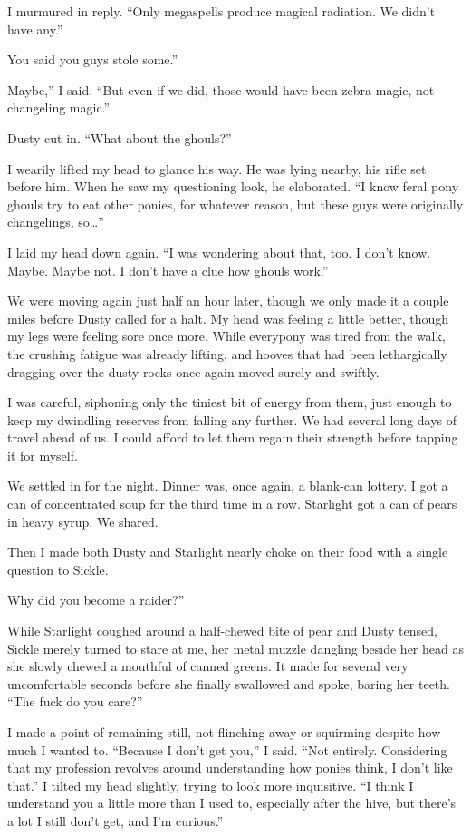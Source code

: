 I murmured in reply. “Only megaspells produce magical radiation. We didn’t have any.”

\leavevmode{}You said you guys stole some.”

\leavevmode{}Maybe,” I said. “But even if we did, those would have been zebra magic, not changeling magic.”

Dusty cut in. “What about the ghouls?”

I wearily lifted my head to glance his way. He was lying nearby, his rifle set before him. When he saw my questioning look, he elaborated. “I know feral pony ghouls try to eat other ponies, for whatever reason, but these guys were originally changelings, so…”

I laid my head down again. “I was wondering about that, too. I don’t know. Maybe. Maybe not. I don’t have a clue how ghouls work.”

We were moving again just half an hour later, though we only made it a couple miles before Dusty called for a halt. My head was feeling a little better, though my legs were feeling sore once more. While everypony was tired from the walk, the crushing fatigue was already lifting, and hooves that had been lethargically dragging over the dusty rocks once again moved surely and swiftly.

I was careful, siphoning only the tiniest bit of energy from them, just enough to keep my dwindling reserves from falling any further. We had several long days of travel ahead of us. I could afford to let them regain their strength before tapping it for myself.

We settled in for the night. Dinner was, once again, a blank-can lottery. I got a can of concentrated soup for the third time in a row. Starlight got a can of pears in heavy syrup. We shared.

Then I made both Dusty and Starlight nearly choke on their food with a single question to Sickle.

\leavevmode{}Why did you become a raider?”

While Starlight coughed around a half-chewed bite of pear and Dusty tensed, Sickle merely turned to stare at me, her metal muzzle dangling beside her head as she slowly chewed a mouthful of canned greens. It made for several very uncomfortable seconds before she finally swallowed and spoke, baring her teeth. “The fuck do you care?”

I made a point of remaining still, not flinching away or squirming despite how much I wanted to. “Because I don’t get you,” I said. “Not entirely. Considering that my profession revolves around understanding how ponies think, I don’t like that.” I tilted my head slightly, trying to look more inquisitive. “I think I understand you a little more than I used to, especially after the hive, but there’s a lot I still don’t get, and I’m curious.”

